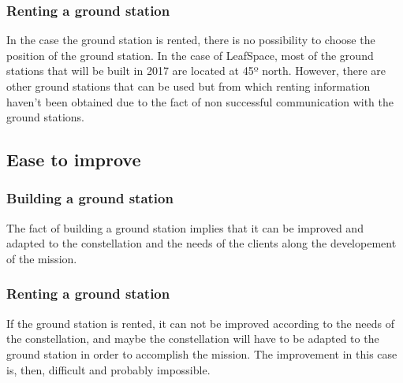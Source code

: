 \subsubsection{Renting a ground station}
In the case the ground station is rented, there is no possibility to choose the position of the ground station. In the case of LeafSpace, most of the ground stations that will be built in 2017 are located at 45º north. However, there are other ground stations that can be used but from which renting information haven't been obtained due to the fact of non successful communication with the ground stations.
\subsection{Ease to improve}
\subsubsection{Building a ground station}
The fact of building a ground station implies that it can be improved and adapted to the constellation and the needs of the clients along the developement of the mission. 
\subsubsection{Renting a ground station}
If the ground station is rented, it can not be improved according to the needs of the constellation, and maybe the constellation will have to be adapted to the ground station in order to accomplish the mission. The improvement in this case is, then, difficult and probably impossible.
